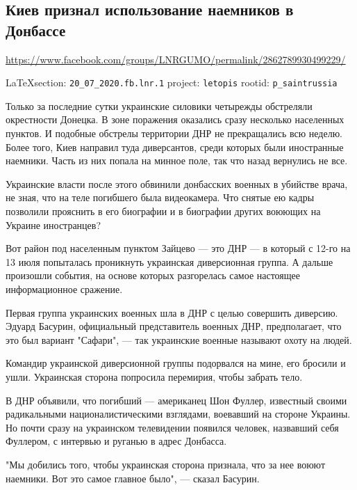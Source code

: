  
 
\subsection{Киев признал использование наемников в Донбассе}
\label{sec:20_07_2020.fb.lnr.1}
\url{https://www.facebook.com/groups/LNRGUMO/permalink/2862789930499229/}
  
\vspace{0.5cm}
{\small\LaTeX section: \verb|20_07_2020.fb.lnr.1| project: \verb|letopis| rootid: \verb|p_saintrussia|}
\vspace{0.5cm}

Только за последние сутки украинские силовики четырежды обстреляли окрестности
Донецка. В зоне поражения оказались сразу несколько населенных пунктов. И
подобные обстрелы территории ДНР не прекращались всю неделю. Более того, Киев
направил туда диверсантов, среди которых были иностранные наемники. Часть из
них попала на минное поле, так что назад вернулись не все. 

Украинские власти после этого обвинили донбасских военных в убийстве врача, не
зная, что на теле погибшего была видеокамера. Что снятые ею кадры позволили
прояснить в его биографии и в биографии других воюющих на Украине иностранцев?

Вот район под населенным пунктом Зайцево --- это ДНР --- в который с 12-го на 13
июля попыталась проникнуть украинская диверсионная группа. А дальше произошли
события, на основе которых разгорелась самое настоящее информационное сражение.

Первая группа украинских военных шла в ДНР с целью совершить диверсию. Эдуард
Басурин, официальный представитель военных ДНР, предполагает, что это был
вариант "Сафари", --- так украинские военные называют охоту на людей.

Командир украинской диверсионной группы подорвался на мине, его бросили и ушли.
Украинская сторона попросила перемирия, чтобы забрать тело.

В ДНР объявили, что погибший --- американец Шон Фуллер, известный своими
радикальными националистическими взглядами, воевавший на стороне Украины. Но
почти сразу на украинском телевидении появился человек, назвавший себя
Фуллером, с интервью и руганью в адрес Донбасса.

"Мы добились того, чтобы украинская сторона признала, что за нее воюют
наемники. Вот это самое главное было", --- сказал Басурин.

